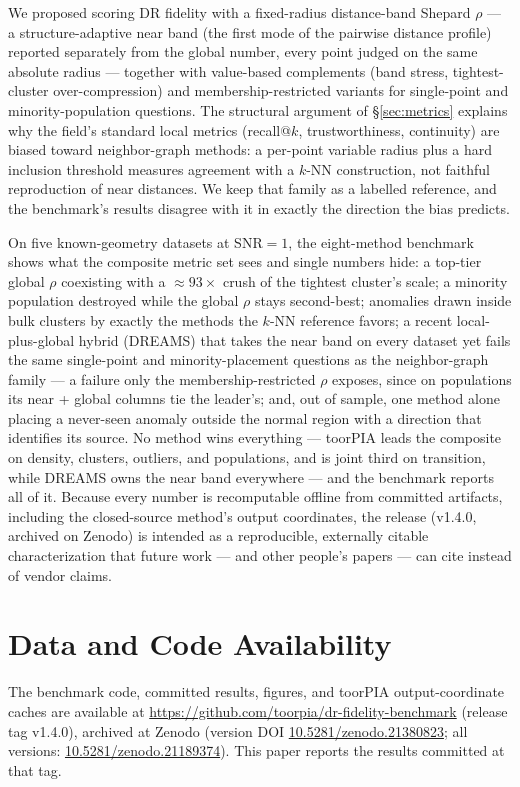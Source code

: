 \documentclass[11pt]{article}
\begin{document}
We proposed scoring DR fidelity with a fixed-radius distance-band Shepard
$\rho$ --- a structure-adaptive near band (the first mode of the pairwise
distance profile) reported separately from the global number, every point
judged on the same absolute radius --- together with value-based complements
(band stress, tightest-cluster over-compression) and membership-restricted
variants for single-point and minority-population questions. The structural
argument of \S\ref{sec:metrics} explains why the field's standard local
metrics (recall@$k$, trustworthiness, continuity) are biased toward
neighbor-graph methods: a per-point variable radius plus a hard inclusion
threshold measures agreement with a $k$-NN construction, not faithful
reproduction of near distances. We keep that family as a labelled reference,
and the benchmark's results disagree with it in exactly the direction the
bias predicts.

On five known-geometry datasets at SNR${=}1$, the eight-method benchmark
shows what the composite metric set sees and single numbers hide: a
top-tier global $\rho$ coexisting with a ${\approx}93\times$ crush of the
tightest cluster's scale; a minority population destroyed while the global
$\rho$ stays second-best; anomalies drawn inside bulk clusters by exactly
the methods the $k$-NN reference favors; a recent local-plus-global hybrid
(DREAMS) that takes the near band on every dataset yet fails the same
single-point and minority-placement questions as the neighbor-graph family
--- a failure only the membership-restricted $\rho$ exposes, since on
populations its near + global columns tie the leader's; and, out of sample,
one method
alone placing a never-seen anomaly outside the normal region with a
direction that identifies its source. No method wins everything --- toorPIA
leads the composite on density, clusters, outliers, and populations, and is
joint third on
transition, while DREAMS owns the near band everywhere --- and the
benchmark reports all of it. Because every number is recomputable offline
from committed artifacts, including the closed-source method's output
coordinates, the release (v1.4.0, archived on Zenodo) is intended as a
reproducible, externally citable characterization that future work --- and
other people's papers --- can cite instead of vendor claims.

\section*{Data and Code Availability}
The benchmark code, committed results, figures, and toorPIA output-coordinate
caches are available at \url{https://github.com/toorpia/dr-fidelity-benchmark}
(release tag v1.4.0), archived at Zenodo (version DOI
\href{https://doi.org/10.5281/zenodo.21380823}{10.5281/zenodo.21380823};
all versions:
\href{https://doi.org/10.5281/zenodo.21189374}{10.5281/zenodo.21189374}).
This paper reports the results committed at that tag.



\end{document}
